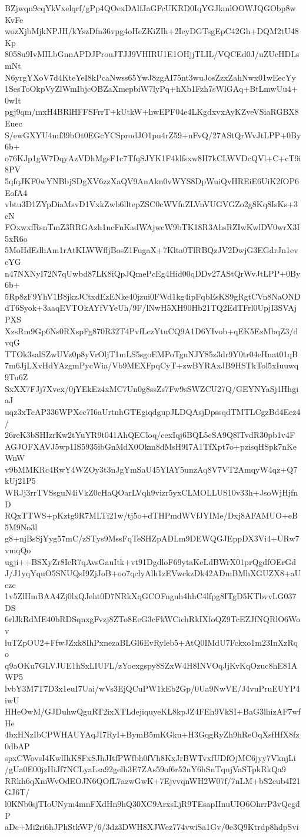 BZjwqn9cqYkVxelqrf/gPp4QOexDAlfJaGFcUKRD0IqYGJkmlOOWJQGObp8wKvFe
wozXjbMjkNPJH/kYszDfn36vpg4oHeZKiZIh+2IeyDGTsgEpC42Gh+DQM2tU48Kp
8058u9IvMILbGnnAPDJProuJTJJ9VHIRU1E1OHjjTLIL/VQCEd0J/uZUcHDLsmNt
N6yrgYXoV7d4KteYeI8kPcaNwss65YwJ8zgAI75nt3wuJosZzxZahNwx01wEecYy
1SesToOkpVyZlWmIbjcOBZaXmepbiW7lyPq+hXb1Fzh7sWlGAq+BtLmwUu4+0wIt
pgj9qm/mxH4BRlHFFSFrrT+kUtkW+hwEPF04e4LKgdxvxAyKZveVSiaRGBX8Euec
S/ewGXYU4mf39bOt0EGcYCSprodJO1pu4rZ59+nFvQ/27AStQrWvJtLPP+0By6b+
o76KJp1gW7DqyAzVDhMgsF1c7TfqSJYK1F4klfsxw8H7kCLWVDcQVl+C+cT9i8PV
5qfqJKF0wYNBbjSDgXV6zzXaQV9AnAkn0vWYS8DpWuiQvHREiE6UiK2fOP6EofA4
vbtu3D1ZYpDiaMsvD1VxkZwb6lltepZSC0cWVfnZLVnVUGVGZo2g8Kq8IsKs+3eN
FOxwxfRsnTmZ3RRGAzh1ncFnKadWAjwcW9bTK18R3AhsRZIwKwlDV0wrX3I5xR6o
5MoHdEdhAm1rAtKLWWffjBosZ1FugaX+7Klta0TlRBQzJV2DwjG3EGdrJn1evcYG
n47NXNyI72N7qUwbd87LK8iQpJQmePcEg4Hid00qDDv27AStQrWvJtLPP+0By6b+
5Rp8zF9YhV1B8jkzJCtxdEzENke40jzui0FWd1kg4ipFqbEsKS9gRgtCVn8NaOND
dT6Syok+3aaqEVTOkAYfVYeUh/9F/lNwH5XH90Hb21TQ2EdTFrl0UpjI3SVAjPXS
XzsRm9Gp6Ns0RXspFg870R32T4PvfLczYtuCQ9A1D6YIvob+qEK5EzMbqZ3/dvqG
TTOk3salSZwUVz0p8yVrOljT1mLS5sgoEMPoTgnNJY85z3dr9Y0tr04eHnat01qB
7m6JjLXvHdYAzgmPycWia/Vb9MEXFpqCyT+zwBYRAxJB9HSTkTol5xIuuwq9Tu6Z
SxXX7FJj7Xvex/0jYEkEz4xMC7Un0g8ssZs7Fw9sSWZCU27Q/GEYNYaSj1HhgiaJ
uqz3xTcAP336WPXcc7I6aUrtnhGTEgiqdgupJLDQAsjDpssqdTMTLCgzBd4Eez4/
26reK3bSHIzrKw2tYuYR9t041AhQECloq/cexIqj6BQL5cSA9Q8lTvdR30pb1v4F
AGJOFXAVJ5wp1IS5935ibGnMdX0Okm8dMsH9I7A1TfXpt7o+pzisqHSpk7nKeWnW
v9bMMKRc4RwY4WZOy3t3nJgYmSaU45YlAY5unzAq8V7VT2AmqyW4qz+Q7kUj21P5
WRJj3rrTVSsguN4iVkZ0cHaQOarLVqh9vizr5yxCLMOLLUS10v33h+JsoWjHjfnD
RQxTTWS+pKztg9R7MLTi21w/tj5o+dTHPmdWVfJYIMe/Dxj8AFAMUO+eB5M9No3l
g8+njBsSjYyg57mC/zSTys9MssFqTeSHZpADLm9DEWQGJEppDX3Vi4+URw7vmqQo
ugji++BSXyZr8IeR7qAvsGauItk+vt91DgdloF69ytaKeLdBWrX01prQgdfOErGd
J/J1yqYquO5SNUQsI9ZjJoB+oo7qclyAlh1zEVwckzDk42ADmBMhXGUZX8+aUczc
1v5ZlHmBAA4Zj0lxQJeht0D7NRkXqGCOFngnh4hhC4lfpg8ITgD5KTbvvLG037DS
6rlJkRdME40bRDSqnxgFvzj8ZTo8EeG3cFkWCichRkIXfoQZ9TcEZJfNQRlO6Wov
luTZpOU2+FfwJZxk8IhPxnezaBLGl6EvRyleb5+AtQ0IMdU7Fckxo1m23InXzRqo
q9aOKu7GLVJUE1hSxLIUFL/zYoexgspy8SZxW4H8INVOqJjKvKqOzuc8hE81AWP5
lvbY3M7T7D3x1euI7Uai/wVs3EjQCuPW1kEb2Gp/0Ua9NwVE/J4vuPruEUYP4iwU
HHeOwM/GJDuhwQguRT2ixXTLdejiquyeKL8kpJZ4FEh9VkSI+BaG3lhizAF7wfHe
4bxHNzIbCPWHAUYAqJI7RyI+BymB5mKGku+H3GqgRyZh9hReOqXsfHfX8fz0dbAP
spxCWovsI4KwlIhK8FxSJhJItfPWfbh0fVh8KxJrBWTvxfUDfOjMC6jyy7VknjLi
/gUa0E00jzHiJf7NCLyaLsa92gelh3E7ZAs59of6r52nY6hSnTqnjVaSTpkRkQa9
RRkh6qXmWvOdEOJN6QOfL7azwGwK+7EjvvqnWH2W07f/7nLM+bS2cub4I21GJ6T/
l0KNb0sjTIoUNym4mnFXdHn9hQ30XC9ArxsLjR9TEsapIInuUIO6OhrrP3vQegdP
aDc+Mi2ri6hJPhStkWP/6/3dz3DWH8XJWez774vwiSa1Gv/0e3Q9Ktrdp8hdpSvi
